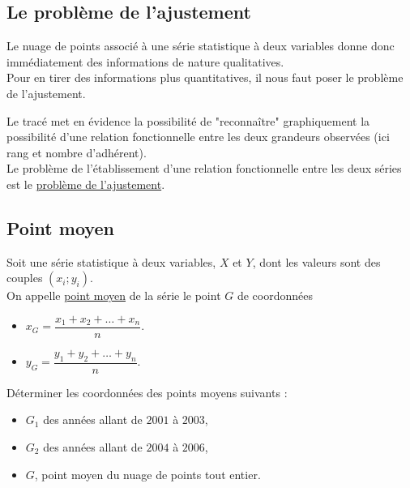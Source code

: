 \documentclass[french]{book}
\begin{document}
\subsection{Le problème de l'ajustement}

Le nuage de points associé à une série statistique à deux variables donne donc immédiatement des informations de nature qualitatives.\\
Pour en tirer des informations plus quantitatives, il nous faut poser le problème de l'ajustement.

Le tracé met en évidence la possibilité de "reconnaître" graphiquement la possibilité d'une relation fonctionnelle entre les deux grandeurs observées (ici rang et nombre d'adhérent).\\
Le problème de l'établissement d'une relation fonctionnelle entre les deux séries est le \underline{problème de l'ajustement}. 

\subsection{Point moyen}

\begin{defn}
   Soit une série statistique à deux variables, $X$ et $Y$, dont les valeurs sont des couples $(x_i;y_i)$.\\
   On appelle \underline{point moyen} de la série le point $G$ de coordonnées
   \begin{itemize}
      \item[$\bullet$] $x_G=\dfrac{x_1+x_2+ \dots + x_n}{n}$.
      \item[$\bullet$] $y_G=\dfrac{y_1+y_2+ \dots + y_n}{n}$.
   \end{itemize}
\end{defn}

\begin{exemple}
   Déterminer les coordonnées des points moyens suivants :
   \begin{itemize}
      \item[$\bullet$] $G_1$ des années allant de $2001$ à $2003$,
      \item[$\bullet$] $G_2$ des années allant de $2004$ à $2006$,
      \item[$\bullet$] $G$, point moyen du nuage de points tout entier.
   \end{itemize}
\end{exemple}
\end{document}

